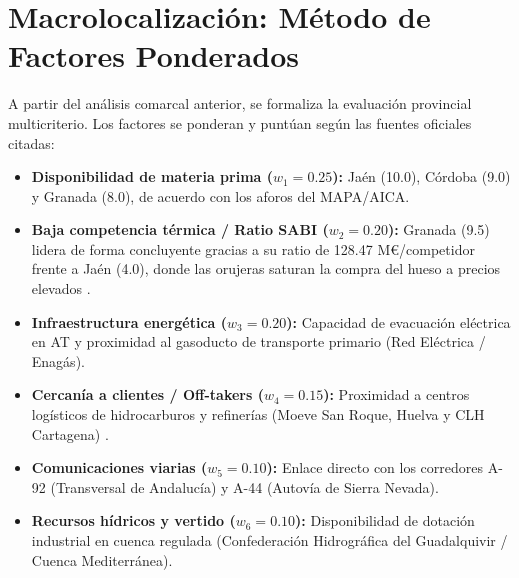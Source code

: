 \documentclass{report}
\begin{document}
\section{Macrolocalización: Método de Factores Ponderados}
A partir del análisis comarcal anterior, se formaliza la evaluación provincial multicriterio. Los factores se ponderan y puntúan según las fuentes oficiales citadas:
\begin{itemize}
    \item \textbf{Disponibilidad de materia prima ($w_1 = \num{0.25}$):} Jaén (\num{10.0}), Córdoba (\num{9.0}) y Granada (\num{8.0}), de acuerdo con los aforos del MAPA/AICA.
    \item \textbf{Baja competencia térmica / Ratio SABI ($w_2 = \num{0.20}$):} Granada (\num{9.5}) lidera de forma concluyente gracias a su ratio de \num{128.47} M€/competidor frente a Jaén (\num{4.0}), donde las orujeras saturan la compra del hueso a precios elevados \autocite{AVEBIOM2026}.
    \item \textbf{Infraestructura energética ($w_3 = \num{0.20}$):} Capacidad de evacuación eléctrica en AT y proximidad al gasoducto de transporte primario (Red Eléctrica / Enagás).
    \item \textbf{Cercanía a clientes / Off-takers ($w_4 = \num{0.15}$):} Proximidad a centros logísticos de hidrocarburos y refinerías (Moeve San Roque, Huelva y CLH Cartagena) \autocite{CORES2026}.
    \item \textbf{Comunicaciones viarias ($w_5 = \num{0.10}$):} Enlace directo con los corredores A-92 (Transversal de Andalucía) y A-44 (Autovía de Sierra Nevada).
    \item \textbf{Recursos hídricos y vertido ($w_6 = \num{0.10}$):} Disponibilidad de dotación industrial en cuenca regulada (Confederación Hidrográfica del Guadalquivir / Cuenca Mediterránea).
\end{itemize}
\end{document}
